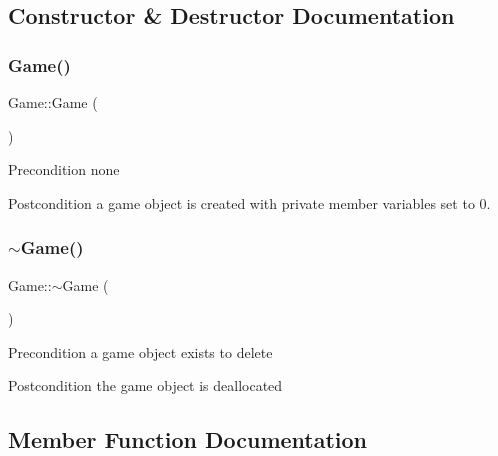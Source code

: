 \subsection{Constructor \& Destructor Documentation}
\mbox{\label{classGame_ad59df6562a58a614fda24622d3715b65}} 
\subsubsection{\texorpdfstring{Game()}{Game()}}
{\footnotesize\ttfamily Game\+::\+Game (\begin{DoxyParamCaption}{ }\end{DoxyParamCaption})}

\begin{DoxyPrecond}{Precondition}
none 
\end{DoxyPrecond}
\begin{DoxyPostcond}{Postcondition}
a game object is created with private member variables set to 0. 
\end{DoxyPostcond}
\mbox{\label{classGame_ae3d112ca6e0e55150d2fdbc704474530}} 
\subsubsection{\texorpdfstring{$\sim$\+Game()}{~Game()}}
{\footnotesize\ttfamily Game\+::$\sim$\+Game (\begin{DoxyParamCaption}{ }\end{DoxyParamCaption})}

\begin{DoxyPrecond}{Precondition}
a game object exists to delete 
\end{DoxyPrecond}
\begin{DoxyPostcond}{Postcondition}
the game object is deallocated 
\end{DoxyPostcond}


\subsection{Member Function Documentation}
\mbox{\label{classGame_ab7dd82dc16ae4dee7031e43b761ffb36}} 
